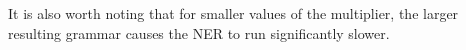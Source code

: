 \documentclass[draft]{article}
\begin{document}
\begin{multicols*}{2}
It is also worth noting that for smaller values of the multiplier, the larger resulting grammar causes the NER to run significantly slower.



\end{multicols*}
\end{document}
